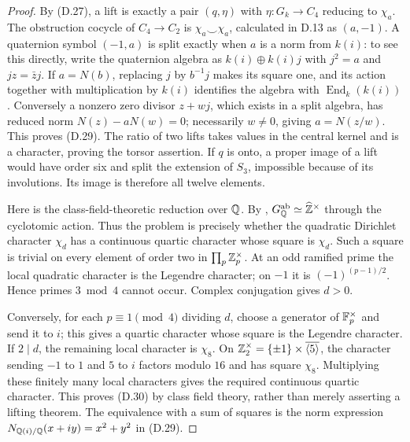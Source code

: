 \begin{proof}
By (D.27), a lift is exactly a pair \((q,\eta)\) with
\(\eta:G_k\to C_4\) reducing to \(\chi_a\).
The obstruction cocycle of \(C_4\to C_2\) is
\(\chi_a\smile\chi_a\), calculated in D.13 as \((a,-1)\).
A quaternion symbol \((-1,a)\) is split exactly when \(a\)
is a norm from \(k(i)\): to see this directly, write the
quaternion algebra as \(k(i)\oplus k(i)j\) with \(j^2=a\)
and \(jz=\bar z j\).  If \(a=N(b)\), replacing \(j\) by
\(b^{-1}j\) makes its square one, and its action together
with multiplication by \(k(i)\) identifies the algebra
with \(\operatorname{End}_k(k(i))\).
Conversely a nonzero zero divisor \(z+w j\), which exists in
a split algebra, has reduced norm
\(N(z)-aN(w)=0\); necessarily \(w\ne0\), giving
\(a=N(z/w)\).  This proves (D.29).
The ratio of two lifts takes values in the central kernel
and is a character, proving the torsor assertion.
If \(q\) is onto, a proper image of a lift would have order
six and split the extension of \(S_3\), impossible because
of its involutions.  Its image is therefore all twelve
elements.

Here is the class-field-theoretic reduction over \(\mathbb Q\).
By \citet[Chapter I, Theorem 4.16]{D_Milne2020},
\(G_\mathbb Q^{\mathrm{ab}}\simeq\widehat{\mathbb Z}^{\times}\) through
the cyclotomic action.  Thus the problem is precisely whether
the quadratic Dirichlet character \(\chi_d\) has a continuous
quartic character whose square is \(\chi_d\).
Such a square is trivial on every element of order two in
\(\prod_p\mathbb Z_p^\times\).
At an odd ramified prime the local quadratic character is
the Legendre character; on \(-1\) it is
\((-1)^{(p-1)/2}\).  Hence primes \(3\bmod4\) cannot occur.
Complex conjugation gives \(d>0\).

Conversely, for each \(p\equiv1\pmod4\) dividing \(d\),
choose a generator of \(\mathbb F_p^\times\) and send it to \(i\);
this gives a quartic character whose square is the Legendre
character.  If \(2\mid d\), the remaining local character
is \(\chi_8\).  On
\(\mathbb Z_2^\times=\{\pm1\}\times\overline{\langle5\rangle}\),
the character sending \(-1\) to \(1\) and \(5\) to \(i\)
factors modulo \(16\) and has square \(\chi_8\).
Multiplying these finitely many local characters gives the
required continuous quartic character.
This proves (D.30) by class field theory, rather than merely
asserting a lifting theorem.
The equivalence with a sum of squares is the norm expression
\(N_{\mathbb Q(i)/\mathbb Q}(x+iy)=x^2+y^2\) in (D.29).
\end{proof}

